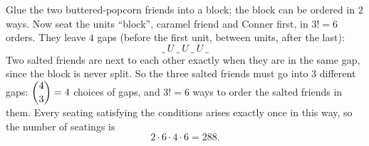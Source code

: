 Glue the two buttered-popcorn friends into a block; the block can be ordered in $2$ ways. Now seat the units ``block'', caramel friend and Conner first, in $3!=6$ orders. They leave $4$ gaps (before the first unit, between units, after the last):
\[\_\ U\ \_\ U\ \_\ U\ \_\]
Two salted friends are next to each other exactly when they are in the same gap, since the block is never split. So the three salted friends must go into $3$ different gaps: $\dbinom43=4$ choices of gaps, and $3!=6$ ways to order the salted friends in them. Every seating satisfying the conditions arises exactly once in this way, so the number of seatings is
\[2\cdot6\cdot4\cdot6=\boxed{288}.\]
